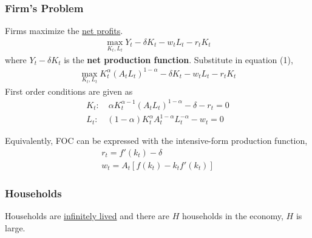 \documentclass[11pt]{article}
\begin{document}
			\subsubsection{Firm's Problem}
				\par Firms maximize the \ul{net profits}.
				\begin{gather}
					\max_{K_t, L_t} Y_t - \delta K_t - w_t L_t - r_t K_t
				\end{gather}
				where $Y_t - \delta K_t$ is the \textbf{net production function}. Substitute in equation (1),
				\begin{gather}
					\max_{K_t, L_t} K_t^\alpha (A_t L_t)^{1-\alpha} - \delta K_t - w_t L_t - r_t K_t
				\end{gather}
				First order conditions are given as
				\begin{gather}
					K_t:\quad \alpha K_t^{\alpha - 1} (A_t L_t)^{1-\alpha} - \delta - r_t = 0 \\
					L_t:\quad (1-\alpha) K_t^\alpha A_t ^{1-\alpha} L_t^{-\alpha} - w_t = 0
				\end{gather}
				\begin{remark}
					Equivalently, FOC can be expressed with the intensive-form production function,
					\begin{gather*}
						r_t = f'(k_t) - \delta\\
						w_t = A_t [f(k_t) - k_t f'(k_t)]
					\end{gather*}
				\end{remark}
			\subsubsection{Households}
				\par Households are \ul{infinitely lived} and there are $H$ households in the economy, $H$ is large.
\end{document}
